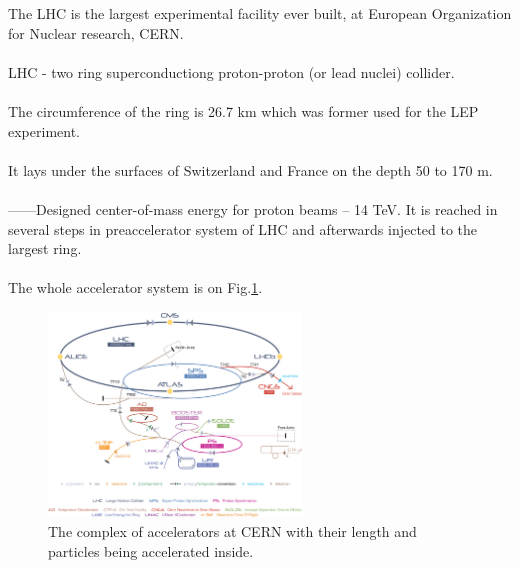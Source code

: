 The LHC is the largest experimental facility ever built, at European Organization for Nuclear research, CERN.
\\
\\
LHC - two ring superconductiong proton-proton (or lead nuclei) collider. 
\\
\\
The circumference of the ring is 26.7 km which was former used for the LEP experiment.
\\
\\
It lays under the surfaces of Switzerland and France on the depth 50 to 170 m.
\\
\\
------Designed center-of-mass energy for proton beams -- 14 TeV. It is reached in several steps in preaccelerator system of LHC
and afterwards injected to the largest ring.
\\
\\
The whole accelerator system is on Fig.\ref{fig:AccelCERN}.
\begin{figure}[t]
  \centering
  \includegraphics[width=0.6\textwidth]{02_experimental_setup/plots/Cern-Accelerator-Complex.png}
  \caption{The complex of accelerators at CERN with their length and particles being accelerated inside.}
  \label{fig:AccelCERN}
\end{figure}

